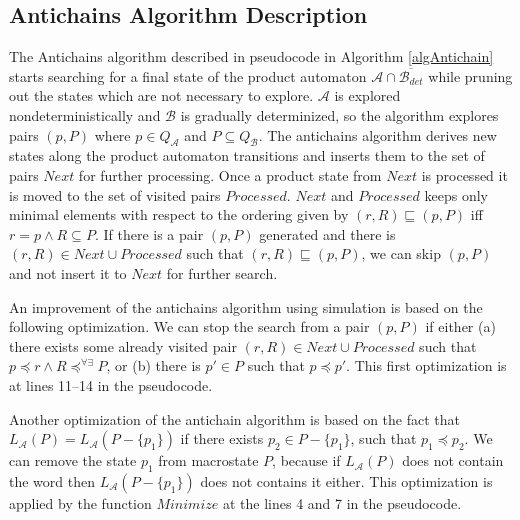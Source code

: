 \subsection{Antichains Algorithm Description}
The Antichains algorithm \cite{cav06} described in pseudocode in Algorithm \ref{algAntichain} 
starts searching for a final state of the product automaton $\mathcal{A}\cap \overline{\mathcal{B}_{det}}$ while
pruning out the states which are not necessary to explore. $\mathcal{A}$ is explored nondeterministically and $\mathcal{B}$ 
is gradually determinized, so the algorithm explores pairs $(p,P)$ where $p\in Q_\mathcal{A}$ and $P \subseteq Q_\mathcal{B}$. 
The antichains algorithm derives new states along the product automaton transitions and inserts them to the set of pairs $Next$ for further processing. 
Once a product state from $Next$ is processed it is moved to the set of visited pairs $Processed$.
$Next$ and $Processed$ keeps only minimal elements with respect to the ordering given by $(r,R)\sqsubseteq (p,P)$ iff $r=p \wedge R \subseteq P$. 
If there is a pair $(p,P)$ generated and there is 
$(r,R)\in Next\cup Processed$ such that $(r,R) \sqsubseteq (p,P)$, we can skip $(p,P)$ and not insert it to $Next$ for further search.
 
An improvement of the antichains algorithm using simulation \cite{tacas10} is based on the following optimization. 
We can stop the search from a pair $(p,P)$ if either (a) there exists some already visited pair $(r,R) \in Next\cup Processed$ 
such that $p\preceq r \wedge R\preceq^{\forall\exists}P$, 
or (b) there is $p' \in P$ such that $p \preceq p'$. This first
optimization is at lines 11--14 in the pseudocode.

Another optimization \cite{tacas10} of the antichain algorithm is based on the fact 
that $L_\mathcal{A}(P)=L_\mathcal{A}(P-\{p_1\})$ if there exists $p_2 \in P-\{p_1\}$, such that $p_1 \preceq p_2$. We can remove the state $p_1$ 
from macrostate $P$, because if $L_\mathcal{A}(P)$ does not contain the word 
then $L_\mathcal{A}(P-\{p_1\})$ does not contains it either. This optimization is applied by the function $Minimize$ at
the lines 4 and 7 in the pseudocode.

